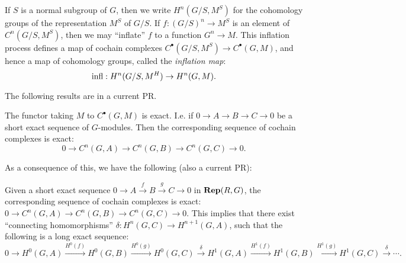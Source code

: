 \begin{definition} \label{def:inflation map}
	If $S$ is a normal subgroup of $G$, then we write $H^n(G/S,M^S)$ for the
	cohomology groups of the representation $M^S$ of $G/S$.
	If $f : (G/S)^n \to M^S$ is an element of $C^n(G/S,M^S)$, then we may ``inflate'' $f$ to
	a function $G^n \to M$. This inflation process defines a map of
	cochain complexes $C^\bullet(G/S,M^S) \to C^\bullet(G,M)$, and hence a map of
	cohomology groups, called the \emph{inflation map}:
	\[
		\mathrm{infl} : H^n(G/S,M^H) \to H^n(G,M).
	\]
\end{definition}

The following results are in a current PR.

\begin{lemma} \label{lem:cochainsFunctor exact}
  The functor taking $M$ to $C^\bullet (G,M)$ is exact.
  I.e. if $0 \to A \to B \to C \to 0$ be a short exact sequence of $G$-modules.
  Then the corresponding sequence of cochain complexes is exact:
  \[
    0 \to C^n(G,A) \to C^n(G,B) \to C^n(G,C) \to 0.
  \]
\end{lemma}

As a consequence of this, we have the following (also a current PR):

\begin{definition} \label{def:cohomology long exact sequence}
  Given a short exact sequence $0 \to A \stackrel{f}\to B \stackrel{g}\to C \to 0$ in $\mathbf{Rep}(R,G)$,
  the corresponding sequence of cochain complexes is exact:
  $0 \to C^n(G,A) \to C^n(G,B) \to C^n(G,C) \to 0$.
  This implies that there exist ``connecting homomorphisms''
	$\delta : H^n(G,C) \to H^{n+1}(G,A)$,
  such that the following is a long exact sequence:
  \[
    0 \to H^0(G,A) \stackrel{H^0(f)}\to H^0(G,B) \stackrel{H^0(g)}\to H^0(G,C) \stackrel{\delta}\to
    H^1(G,A) \stackrel{H^1(f)}\to H^1(G,B) \stackrel{H^1(g)} \to H^1(G,C) \stackrel{\delta}\to \cdots.
  \]
\end{definition}

